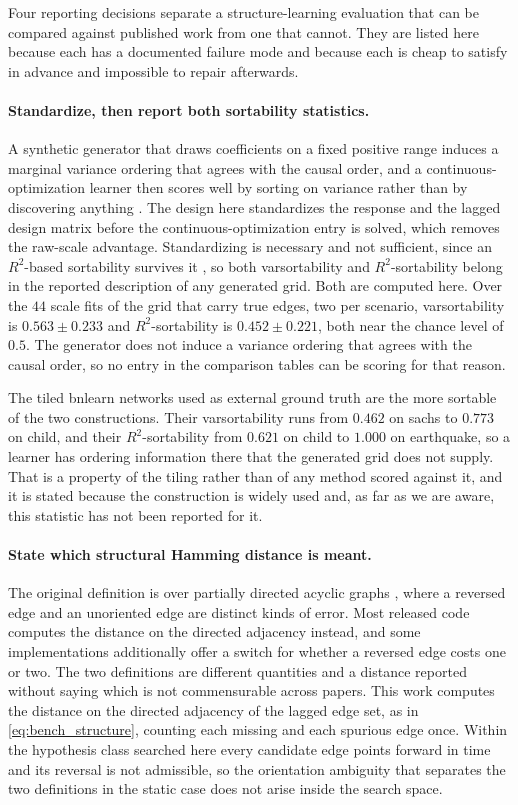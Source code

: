 Four reporting decisions separate a structure-learning evaluation that can be
compared against published work from one that cannot. They are listed here
because each has a documented failure mode and because each is cheap to satisfy
in advance and impossible to repair afterwards.

\paragraph{Standardize, then report both sortability statistics.}
A synthetic generator that draws coefficients on a fixed positive range induces
a marginal variance ordering that agrees with the causal order, and a
continuous-optimization learner then scores well by sorting on variance rather
than by discovering anything \citep{reisach2021varsortability}. The design here
standardizes the response and the lagged design matrix before the
continuous-optimization entry is solved, which removes the raw-scale advantage.
Standardizing is necessary and not sufficient, since an \(R^2\)-based
sortability survives it \citep{reisach2023r2sortability}, so both varsortability
and \(R^2\)-sortability belong in the reported description of any generated
grid. Both are computed here. Over the $44$ scale fits of the grid that carry
true edges, two per scenario, varsortability is $0.563 \pm 0.233$ and
\(R^2\)-sortability is $0.452 \pm 0.221$, both near the chance level of $0.5$.
The generator does not induce a variance ordering that agrees with the causal
order, so no entry in the comparison tables can be scoring for that reason.

The tiled bnlearn networks used as external ground truth are the more sortable
of the two constructions. Their varsortability runs from $0.462$ on sachs to
$0.773$ on child, and their \(R^2\)-sortability from $0.621$ on child to
$1.000$ on earthquake, so a learner has ordering information there that the
generated grid does not supply. That is a property of the tiling rather than of
any method scored against it, and it is stated because the construction is
widely used and, as far as we are aware, this statistic has not been reported
for it.

\paragraph{State which structural Hamming distance is meant.}
The original definition is over partially directed acyclic graphs
\citep{tsamardinos2006mmhc}, where a reversed edge and an unoriented edge are
distinct kinds of error. Most released code computes the distance on the
directed adjacency instead, and some implementations additionally offer a
switch for whether a reversed edge costs one or two. The two definitions are
different quantities and a distance reported without saying which is not
commensurable across papers. This work computes the distance on the directed
adjacency of the lagged edge set, as in \eqref{eq:bench_structure}, counting
each missing and each spurious edge once. Within the hypothesis class searched
here every candidate edge points forward in time and its reversal is not
admissible, so the orientation ambiguity that separates the two definitions in
the static case does not arise inside the search space.

